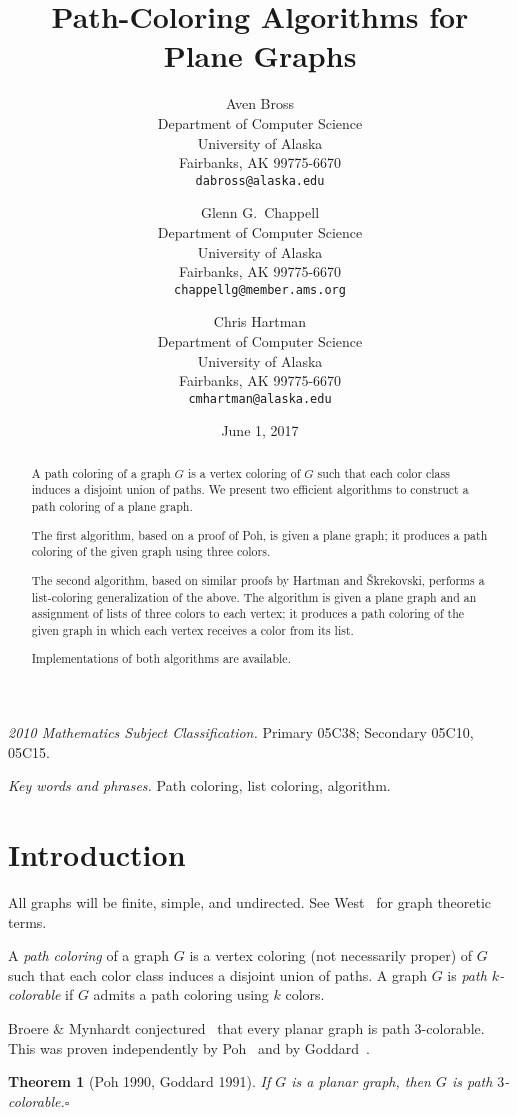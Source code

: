 \documentclass[12pt,letterpaper]{article}
\date{June 1, 2017}
\title{Path-Coloring Algorithms for Plane Graphs}
\author{Aven Bross\\
\small Department of Computer Science\\
\small University of Alaska\\
\small Fairbanks, AK 99775-6670\\
\small\texttt{dabross@alaska.edu} \and
Glenn G.~Chappell\\
\small Department of Computer Science\\
\small University of Alaska\\
\small Fairbanks, AK 99775-6670\\
\small\texttt{chappellg{@}member.ams.org} \and
Chris Hartman\\
\small Department of Computer Science\\
\small University of Alaska\\
\small Fairbanks, AK 99775-6670\\
\small\texttt{cmhartman{@}alaska.edu}}
\theoremstyle{plain}
\newtheorem{theorem}[lemma]{Theorem}         %
\theoremstyle{definition}
\theoremstyle{break}
\newcommand{\ggcqedsymbol}{$\square$}
\newcommand{\ggcqed}{\hbox{}\nobreak\hbox{\quad\ggcqedsymbol}}
\newcommand{\ggcnopf}{\ggcqed}
\newcommand{\defterm}[1]{\emph{#1}} %
\newcommand{\abstdefterm}[1]{#1} %
\begin{document}
\maketitle
\centerline{\small \textit{2010 Mathematics Subject Classification.}
 Primary 05C38; Secondary 05C10, 05C15.}
\centerline{\small \textit{Key words and phrases.}
 Path coloring, list coloring, algorithm.}

\begin{abstract}
A \abstdefterm{path coloring} of a graph $G$ is a vertex coloring
of $G$ such that each color class induces a disjoint union of paths.
We present two efficient algorithms
to construct a path coloring of a plane graph.

The first algorithm, based on a proof of Poh, %
is given a plane graph;
it produces a path coloring of the given graph
using three colors.

The second algorithm,
based on similar proofs
by Hartman %
and \v{S}krekovski, %
performs a list-coloring generalization of the above.
The algorithm is given a plane graph and an assignment of lists of
three colors to each vertex;
it produces a path coloring of the given graph
in which each vertex receives a color from its list.

Implementations of both algorithms are available.
\end{abstract}


\section{Introduction}

All graphs will be finite, simple, and undirected.
See West~\cite{Wes2000} for graph theoretic terms.

A \defterm{path coloring} of a graph $G$ is a vertex coloring
(not necessarily proper) of $G$ such that each color class induces
a disjoint union of paths.
A graph $G$ is \defterm{path $k$-colorable} if $G$
admits a path coloring using $k$ colors.

Broere \& Mynhardt conjectured~\cite[Conj.~16]{BrMy1985}
that every planar graph is path $3$-colorable.
This was proven independently by Poh~\cite[Thm.~2]{Poh1990}
and by Goddard~\cite[Thm.~1]{God1991}.

\begin{theorem}[Poh 1990, Goddard 1991]\label{T:planar3c}
If $G$ is a planar graph,
then $G$ is path $3$-colorable.\ggcnopf\end{theorem}
\end{document}
